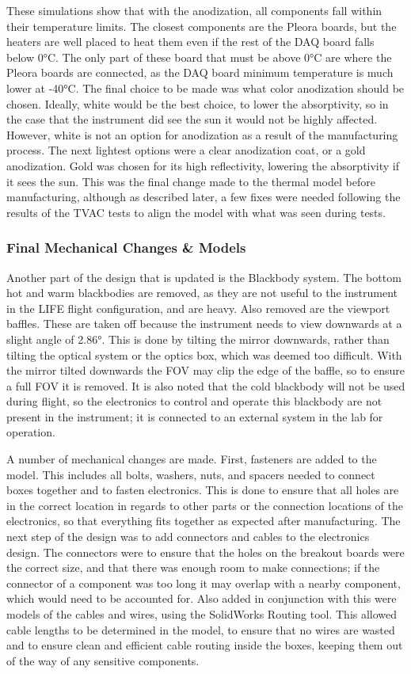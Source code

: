 These simulations show that with the anodization, all components fall within their temperature limits. The closest components are the Pleora boards, but the heaters are well placed to heat them even if the rest of the DAQ board falls below 0°C. The only part of these board that must be above 0°C are where the Pleora boards are connected, as the DAQ board minimum temperature is much lower at -40°C. The final choice to be made was what color anodization should be chosen. Ideally, white would be the best choice, to lower the absorptivity, so in the case that the instrument did see the sun it would not be highly affected. However, white is not an option for anodization as a result of the manufacturing process. The next lightest options were a clear anodization coat, or a gold anodization. Gold was chosen for its high reflectivity, lowering the absorptivity if it sees the sun. This was the final change made to the thermal model before manufacturing, although as described later, a few fixes were needed following the results of the TVAC tests to align the model with what was seen during tests.

\subsubsection{Final Mechanical Changes \& Models}\label{Mech_changes}
Another part of the design that is updated is the Blackbody system. The bottom hot and warm blackbodies are removed, as they are not useful to the instrument in the LIFE flight configuration, and are heavy. Also removed are the viewport baffles. These are taken off because the instrument needs to view downwards at a slight angle of 2.86°. This is done by tilting the mirror downwards, rather than tilting the optical system or the optics box, which was deemed too difficult. With the mirror tilted downwards the FOV may clip the edge of the baffle, so to ensure a full FOV it is removed. It is also noted that the cold blackbody will not be used during flight, so the electronics to control and operate this blackbody are not present in the instrument; it is connected to an external system in the lab for operation.

A number of mechanical changes are made. First, fasteners are added to the model. This includes all bolts, washers, nuts, and spacers needed to connect boxes together and to fasten electronics. This is done to ensure that all holes are in the correct location in regards to other parts or the connection locations of the electronics, so that everything fits together as expected after manufacturing. The next step of the design was to add connectors and cables to the electronics design. The connectors were to ensure that the holes on the breakout boards were the correct size, and that there was enough room to make connections; if the connector of a component was too long it may overlap with a nearby component, which would need to be accounted for. Also added in conjunction with this were models of the cables and wires, using the SolidWorks Routing tool. This allowed cable lengths to be determined in the model, to ensure that no wires are wasted and to ensure clean and efficient cable routing inside the boxes, keeping them out of the way of any sensitive components.

